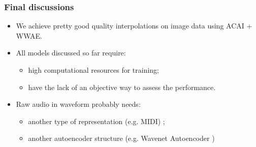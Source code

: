 \documentclass{beamer}
\begin{document}
\begin{frame}
\frametitle{Final discussions}
\begin{itemize}
  \item We achieve pretty good quality interpolations on image data using ACAI + WWAE.
  \medskip
  \item All models discussed so far require:
  \begin{itemize}
    \item high computational resources for training;
    \item have the lack of an objective way to assess the performance.
  \end{itemize}
  \medskip
  \item Raw audio in waveform probably needs:
  \begin{itemize}
    \item another type of representation (e.g. MIDI) \cite{music1} \cite{music2};
    \item another autoencoder structure (e.g. Wavenet Autoencoder \cite{wavenetae})
  \end{itemize}
\end{itemize}
\end{frame}
\begingroup
\footnotesize
\end{document}

